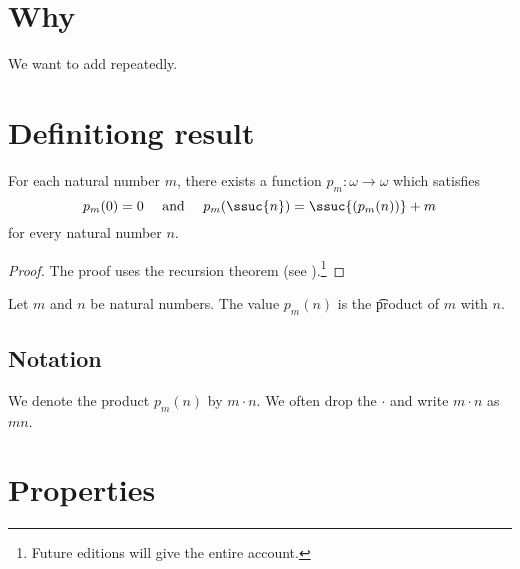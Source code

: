 

\section*{Why}

We want to add repeatedly.

\section*{Definitiong result}

\begin{proposition}
For each natural number $m$, there exists a function $p_m: \omega  \to \omega $ which satisfies
  \[
p_m(0) = 0 \quad \text{ and } \quad p_m(\ssuc{n}) = \ssuc{(p_m(n))} + m
  \]
for every natural number $n$.\end{proposition}
\begin{proof}The proof uses the recursion theorem (see ).\footnote{Future editions will give the entire account.}\end{proof}
Let $m$ and $n$ be natural numbers.
The value $p_m(n)$ is the \t{product} of $m$ with $n$.

% 

\subsection*{Notation}

We denote the product $p_m(n)$ by $m \cdot  n$.
We often drop the $\cdot $ and write $m \cdot  n$ as $mn$.


\section*{Properties}

